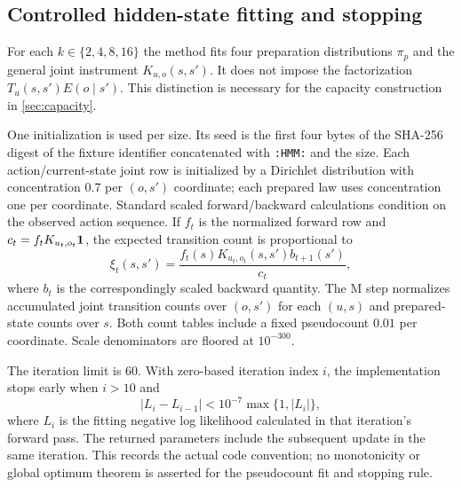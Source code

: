 \subsection{Controlled hidden-state fitting and stopping}\label{app:em}
For each $k\in\{2,4,8,16\}$ the method fits four preparation distributions $\pi_p$ and the general joint instrument $K_{u,o}(s,s')$. It does not impose the factorization $T_u(s,s')E(o\mid s')$. This distinction is necessary for the capacity construction in \cref{sec:capacity}.

One initialization is used per size. Its seed is the first four bytes of the SHA-256 digest of the fixture identifier concatenated with \texttt{:HMM:} and the size. Each action/current-state joint row is initialized by a Dirichlet distribution with concentration $0.7$ per $(o,s')$ coordinate; each prepared law uses concentration one per coordinate. Standard scaled forward/backward calculations condition on the observed action sequence. If $f_t$ is the normalized forward row and $c_t=f_tK_{u_t,o_t}\mathbf 1$, the expected transition count is proportional to
\begin{equation}
 \xi_t(s,s')=
 \frac{f_t(s)K_{u_t,o_t}(s,s')b_{t+1}(s')}{c_t},
\end{equation}
where $b_t$ is the correspondingly scaled backward quantity. The M step normalizes accumulated joint transition counts over $(o,s')$ for each $(u,s)$ and prepared-state counts over $s$. Both count tables include a fixed pseudocount $0.01$ per coordinate. Scale denominators are floored at $10^{-300}$.

The iteration limit is 60. With zero-based iteration index $i$, the implementation stops early when $i>10$ and
\begin{equation}\label{eq:em-stop}
 |L_i-L_{i-1}|<10^{-7}\max\{1,|L_i|\},
\end{equation}
where $L_i$ is the fitting negative log likelihood calculated in that iteration's forward pass. The returned parameters include the subsequent update in the same iteration. This records the actual code convention; no monotonicity or global optimum theorem is asserted for the pseudocount fit and stopping rule.


